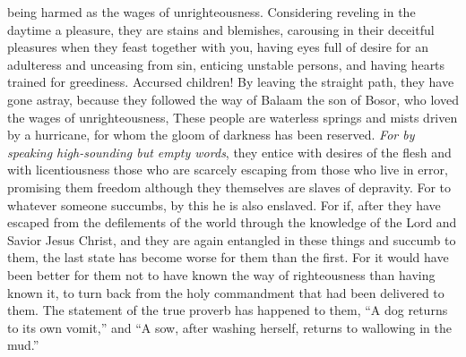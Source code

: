 \begin{biblechapter}
\verse being harmed as the wages of unrighteousness. Considering reveling in the daytime a pleasure, they are stains and blemishes, carousing in their deceitful pleasures when they feast together with you,
\verse having eyes full of desire for an adulteress and unceasing from sin, enticing unstable persons, and having hearts trained for greediness. Accursed children!
\verse By leaving the straight path, they have gone astray, because they followed the way of Balaam the son of Bosor, who loved the wages of unrighteousness,
\verse These people are waterless springs and mists driven by a hurricane, for whom the gloom of darkness has been reserved.
\verse \textit{For by speaking high-sounding but empty words}, they entice with desires of the flesh and with licentiousness those who are scarcely escaping from those who live in error,
\verse promising them freedom although they themselves are slaves of depravity. For to whatever someone succumbs, by this he is also enslaved.
\verse For if, after they have escaped from the defilements of the world through the knowledge of the Lord and Savior Jesus Christ, and they are again entangled in these things and succumb to them, the last state has become worse for them than the first.
\verse For it would have been better for them not to have known the way of righteousness than having known it, to turn back from the holy commandment that had been delivered to them.
\verse The statement of the true proverb has happened to them, “A dog returns to its own vomit,” and “A sow, after washing herself, returns to wallowing in the mud.”
\end{biblechapter}

